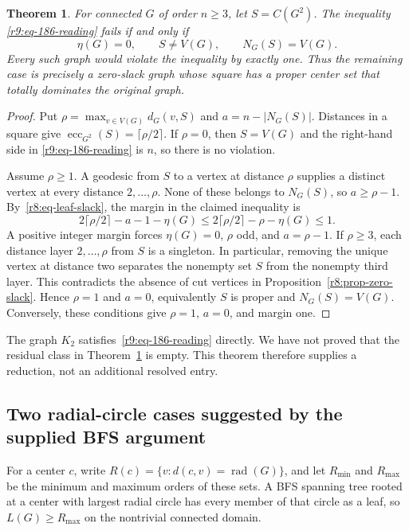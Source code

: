 \documentclass[11pt,a4paper]{article}
\newtheorem{theorem}{Theorem}[section]
\theoremstyle{remark}
\begin{document}
\begin{theorem}\label{r9:thm-186-residual}
For connected $G$ of order $n\ge3$, let $S=C(G^2)$.  The inequality
\eqref{r9:eq-186-reading} fails if and only if
\[
 \eta(G)=0,\qquad S\ne V(G),\qquad N_G(S)=V(G).
\]
Every such graph would violate the inequality by exactly one.
Thus the remaining case is precisely a zero-slack graph whose square
has a proper center set that totally dominates the original graph.
\end{theorem}
\begin{proof}
Put $\rho=\max_{v\in V(G)}d_G(v,S)$ and
$a=n-|N_G(S)|$.  Distances in a square give
$\operatorname{ecc}_{G^2}(S)=\lceil\rho/2\rceil$.
If $\rho=0$, then $S=V(G)$ and the right-hand side in
\eqref{r9:eq-186-reading} is $n$, so there is no violation.

Assume $\rho\ge1$.  A geodesic from $S$ to a vertex at distance
$\rho$ supplies a distinct vertex at every distance
$2,\ldots,\rho$.  None of these belongs to $N_G(S)$, so
$a\ge\rho-1$.  By~\eqref{r8:eq-leaf-slack}, the margin in the
claimed inequality is
\[
 2\lceil\rho/2\rceil-a-1-\eta(G)
 \le 2\lceil\rho/2\rceil-\rho-\eta(G)\le1.
\]
A positive integer margin forces $\eta(G)=0$, $\rho$ odd, and
$a=\rho-1$.  If $\rho\ge3$, each distance layer
$2,\ldots,\rho$ from $S$ is a singleton.  In particular, removing
the unique vertex at distance two separates the nonempty set $S$
from the nonempty third layer.  This contradicts the absence of cut
vertices in Proposition~\ref{r8:prop-zero-slack}.  Hence $\rho=1$
and $a=0$, equivalently $S$ is proper and $N_G(S)=V(G)$.
Conversely, these conditions give $\rho=1$, $a=0$, and margin one.
\end{proof}

The graph $K_2$ satisfies~\eqref{r9:eq-186-reading} directly.  We have
not proved that the residual class in
Theorem~\ref{r9:thm-186-residual} is empty.  This theorem therefore
supplies a reduction, not an additional resolved entry.


\subsection{Two radial-circle cases suggested by the supplied BFS argument}
For a center $c$, write $R(c)=\{v:d(c,v)=\operatorname{rad}(G)\}$,
and let $R_{\min}$ and $R_{\max}$ be the minimum and maximum orders
of these sets. A BFS spanning tree rooted at a center with largest
radial circle has every member of that circle as a leaf, so
$L(G)\ge R_{\max}$ on the nontrivial connected domain.
\end{document}
